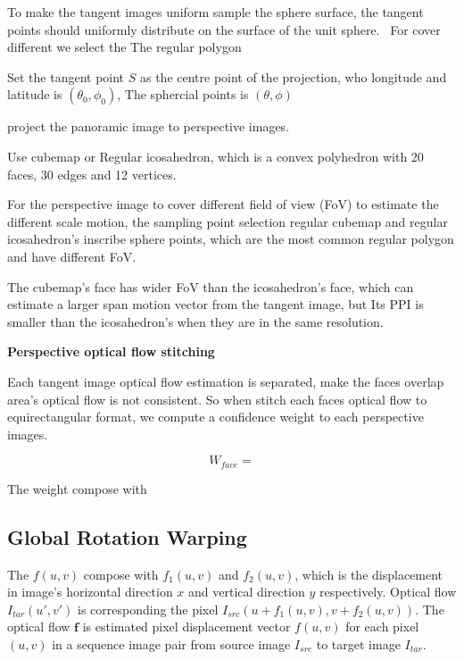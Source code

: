 To make the tangent images uniform sample the sphere surface, the tangent points should uniformly distribute on the surface of the unit sphere.~\cite{??}
For cover different we select the 
The regular polygon ~\cite{??} 


Set the tangent point $S$ as the centre point of the projection, who longitude and latitude is $(\theta_0, \phi_0)$,
The sphercial points is $(\theta, \phi)$

project the panoramic image to perspective images.

Use cubemap or Regular icosahedron, which is a convex polyhedron with 20 faces, 30 edges and 12 vertices.

For the perspective image to cover different field of view (FoV)  to estimate the different scale motion, the sampling point selection regular cubemap and regular icosahedron's inscribe sphere points, which are the most common regular polygon and have different FoV. ~\cite{?}

The cubemap's face has wider FoV than the icosahedron's face, which can estimate a larger span motion vector from the tangent image, but Its PPI is smaller than the icosahedron's when they are in the same resolution.


\textbf{Perspective optical flow stitching}

Each tangent image optical flow estimation is separated, make the faces overlap area's optical flow is not consistent.
So when stitch each faces optical flow to equirectangular format, we compute a confidence weight to each perspective images. 

\begin{equation}
W_{face} =
\end{equation}


The weight compose with 



\subsection{Global Rotation Warping}
\label{sec:approach:warping}

The $f(u,v)$ compose with $f_1(u,v)$ and $f_2(u,v)$, which is the displacement in image's horizontal direction $x$ and vertical direction $y$ respectively.
Optical flow 
$I_{tar}(u',v')$ is corresponding the pixel $I_{src}(u + f_1(u,v), v + f_2(u,v))$.
The optical flow $\textbf{f}$ is estimated pixel displacement vector $f(u,v)$ for each pixel $(u,v)$ in a sequence image pair from source image $I_{src}$ to target image $I_{tar}$.

